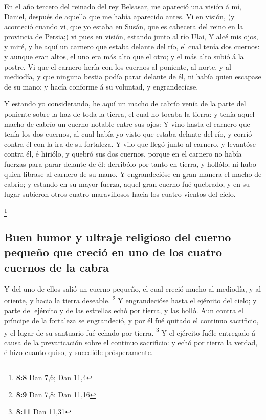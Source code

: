  En el año tercero del reinado del rey Belsasar, me apareció
una visión á mí, Daniel, después de aquella que me había aparecido
antes.  Vi en visión, (y aconteció cuando vi, que yo estaba
en Susán, que es cabecera del reino en la provincia de Persia;) vi pues
en visión, estando junto al río Ulai,  Y alcé mis ojos, y
miré, y he aquí un carnero que estaba delante del río, el cual tenía dos
cuernos: y aunque eran altos, el uno era más alto que el otro; y el más
alto subió á la postre.  Vi que el carnero hería con los
cuernos al poniente, al norte, y al mediodía, y que ninguna bestia podía
parar delante de él, ni había quien escapase de su mano: y hacía
conforme á su voluntad, y engrandecíase.

 Y estando yo considerando, he aquí un macho de cabrío venía
de la parte del poniente sobre la haz de toda la tierra, el cual no
tocaba la tierra: y tenía aquel macho de cabrío un cuerno notable entre
sus ojos:  Y vino hasta el carnero que tenía los dos
cuernos, al cual había yo visto que estaba delante del río, y corrió
contra él con la ira de su fortaleza.  Y vilo que llegó
junto al carnero, y levantóse contra él, é hiriólo, y quebró sus dos
cuernos, porque en el carnero no había fuerzas para parar delante de él:
derribólo por tanto en tierra, y hollólo; ni hubo quien librase al
carnero de su mano.  Y engrandecióse en gran manera el macho
de cabrío; y estando en su mayor fuerza, aquel gran cuerno fué quebrado,
y en su lugar subieron otros cuatro maravillosos hacia los cuatro
vientos del cielo.

\footnote{\textbf{8:8} Dan 7,6; Dan 11,4}

\hypertarget{buen-humor-y-ultraje-religioso-del-cuerno-pequeuxf1o-que-creciuxf3-en-uno-de-los-cuatro-cuernos-de-la-cabra}{%
\subsection{Buen humor y ultraje religioso del cuerno pequeño que creció
en uno de los cuatro cuernos de la
cabra}\label{buen-humor-y-ultraje-religioso-del-cuerno-pequeuxf1o-que-creciuxf3-en-uno-de-los-cuatro-cuernos-de-la-cabra}}

 Y del uno de ellos salió un cuerno pequeño, el cual creció
mucho al mediodía, y al oriente, y hacia la tierra deseable. \footnote{\textbf{8:9}
  Dan 7,8; Dan 11,16}  Y engrandecióse hasta el ejército
del cielo; y parte del ejército y de las estrellas echó por tierra, y
las holló.  Aun contra el príncipe de la fortaleza se
engrandeció, y por él fué quitado el continuo sacrificio, y el lugar de
su santuario fué echado por tierra. \footnote{\textbf{8:11} Dan 11,31}
 Y el ejército fuéle entregado á causa de la prevaricación
sobre el continuo sacrificio: y echó por tierra la verdad, é hizo cuanto
quiso, y sucedióle prósperamente.


